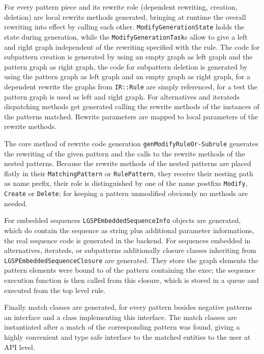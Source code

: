 For every pattern piece and its rewrite role (dependent rewriting, creation, deletion) are local rewrite methods generated, bringing at runtime the overall rewriting into effect by calling each other.
\texttt{Modify\-Generation\-State} holds the state during generation, while the \texttt{Modify\-Generation\-Task}s allow to give a left and right graph independent of the rewriting specified with the rule. The code for subpattern creation is generated by using an empty graph as left graph and the pattern graph as right graph, the code for subpattern deletion is generated by using the pattern graph as left graph and an empty graph as right graph, for a dependent rewrite the graphs from \texttt{IR::Rule} are simply referenced, for a test the pattern graph is used as left and right graph.
For alternatives and iterateds dispatching methods get generated calling the rewrite methods of the instances of the patterns matched.
Rewrite parameters are mapped to local parameters of the rewrite methods.

The core method of rewrite code generation \texttt{gen\-Modify\-Rule\-Or-Subrule} generates the rewriting of the given pattern and the calls to the rewrite methods of the nested patterns.
Because the rewrite methods of the nested patterns are placed flatly in their \texttt{Matching\-Pattern} or \texttt{Rule\-Pattern}, they receive their nesting path as name prefix, their role is distinguished by one of the name postfixs \texttt{Modify}, \texttt{Create} or \texttt{Delete}; for keeping a pattern unmodified obviously no methods are needed.

For embedded sequences \texttt{LGSPEmbeddedSequenceInfo} objects are generated, which do contain the sequence as string plus additional parameter informations, the real sequence code is generated in the backend.
For sequences embedded in alternatives, iterateds, or subpatterns additionally closure classes inheriting from \texttt{LGSPEmbeddedSequenceClosure} are generated.
They store the graph elements the pattern elements were bound to of the pattern containing the exec; the sequence execution function is then called from this closure, which is stored in a queue and executed from the top level rule.

Finally match classes are generated, for every pattern besides negative patterns an interface and a class implementing this interface.
The match classes are instantiated after a match of the corresponding pattern was found, giving a highly convenient and type safe interface to the matched entities to the user at API level.


